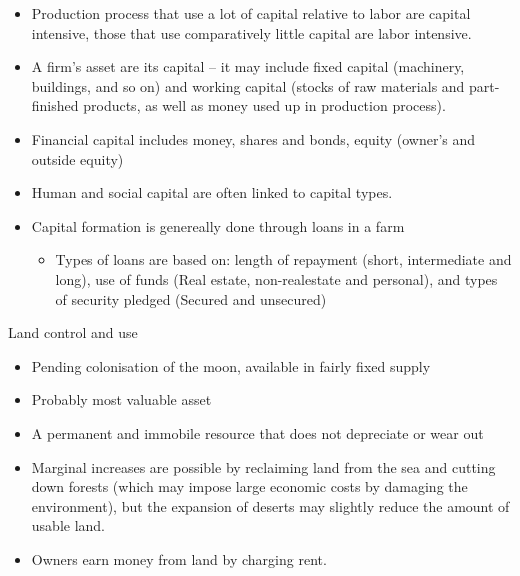 \documentclass[12pt,ignorenonframetext,aspectratio=169]{beamer}
\providecommand{\tightlist}{%
  \setlength{\itemsep}{0pt}\setlength{\parskip}{0pt}}
\begin{document}
\begin{frame}{}
\protect\hypertarget{section-3}{}

\begin{itemize}
\tightlist
\item
  Production process that use a lot of capital relative to labor are
  capital intensive, those that use comparatively little capital are
  labor intensive.
\item
  A firm's asset are its capital -- it may include fixed capital
  (machinery, buildings, and so on) and working capital (stocks of raw
  materials and part-finished products, as well as money used up in
  production process).
\item
  Financial capital includes money, shares and bonds, equity (owner's
  and outside equity)
\item
  Human and social capital are often linked to capital types.
\item
  Capital formation is genereally done through loans in a farm

  \begin{itemize}
  \tightlist
  \item
    Types of loans are based on: length of repayment (short,
    intermediate and long), use of funds (Real estate, non-realestate
    and personal), and types of security pledged (Secured and unsecured)
  \end{itemize}
\end{itemize}

\end{frame}

\begin{frame}{Land control and use}
\protect\hypertarget{land-control-and-use}{}

\begin{itemize}
\tightlist
\item
  Pending colonisation of the moon, available in fairly fixed supply
\item
  Probably most valuable asset
\item
  A permanent and immobile resource that does not depreciate or wear out
\item
  Marginal increases are possible by reclaiming land from the sea and
  cutting down forests (which may impose large economic costs by
  damaging the environment), but the expansion of deserts may slightly
  reduce the amount of usable land.
\item
  Owners earn money from land by charging rent.
\end{itemize}

\end{frame}
\end{document}
